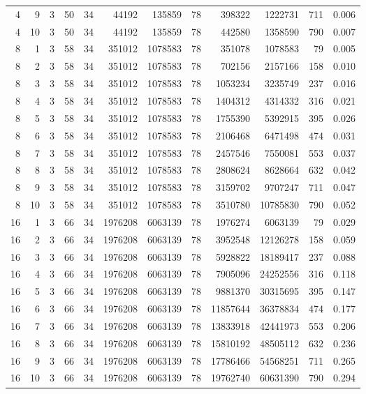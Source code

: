 \begin{table}[t]
\begin{tabularx}{\linewidth}{rrrrrrrrrrrr}
4 & 9 & 3 & 50 & 34 & 44192 & 135859 & 78 & 398322 & 1222731 & 711 & 0.006 \\
4 & 10 & 3 & 50 & 34 & 44192 & 135859 & 78 & 442580 & 1358590 & 790 & 0.007 \\
8 & 1 & 3 & 58 & 34 & 351012 & 1078583 & 78 & 351078 & 1078583 & 79 & 0.005 \\
8 & 2 & 3 & 58 & 34 & 351012 & 1078583 & 78 & 702156 & 2157166 & 158 & 0.010 \\
8 & 3 & 3 & 58 & 34 & 351012 & 1078583 & 78 & 1053234 & 3235749 & 237 & 0.016 \\
8 & 4 & 3 & 58 & 34 & 351012 & 1078583 & 78 & 1404312 & 4314332 & 316 & 0.021 \\
8 & 5 & 3 & 58 & 34 & 351012 & 1078583 & 78 & 1755390 & 5392915 & 395 & 0.026 \\
8 & 6 & 3 & 58 & 34 & 351012 & 1078583 & 78 & 2106468 & 6471498 & 474 & 0.031 \\
8 & 7 & 3 & 58 & 34 & 351012 & 1078583 & 78 & 2457546 & 7550081 & 553 & 0.037 \\
8 & 8 & 3 & 58 & 34 & 351012 & 1078583 & 78 & 2808624 & 8628664 & 632 & 0.042 \\
8 & 9 & 3 & 58 & 34 & 351012 & 1078583 & 78 & 3159702 & 9707247 & 711 & 0.047 \\
8 & 10 & 3 & 58 & 34 & 351012 & 1078583 & 78 & 3510780 & 10785830 & 790 & 0.052 \\
16 & 1 & 3 & 66 & 34 & 1976208 & 6063139 & 78 & 1976274 & 6063139 & 79 & 0.029 \\
16 & 2 & 3 & 66 & 34 & 1976208 & 6063139 & 78 & 3952548 & 12126278 & 158 & 0.059 \\
16 & 3 & 3 & 66 & 34 & 1976208 & 6063139 & 78 & 5928822 & 18189417 & 237 & 0.088 \\
16 & 4 & 3 & 66 & 34 & 1976208 & 6063139 & 78 & 7905096 & 24252556 & 316 & 0.118 \\
16 & 5 & 3 & 66 & 34 & 1976208 & 6063139 & 78 & 9881370 & 30315695 & 395 & 0.147 \\
16 & 6 & 3 & 66 & 34 & 1976208 & 6063139 & 78 & 11857644 & 36378834 & 474 & 0.177 \\
16 & 7 & 3 & 66 & 34 & 1976208 & 6063139 & 78 & 13833918 & 42441973 & 553 & 0.206 \\
16 & 8 & 3 & 66 & 34 & 1976208 & 6063139 & 78 & 15810192 & 48505112 & 632 & 0.236 \\
16 & 9 & 3 & 66 & 34 & 1976208 & 6063139 & 78 & 17786466 & 54568251 & 711 & 0.265 \\
16 & 10 & 3 & 66 & 34 & 1976208 & 6063139 & 78 & 19762740 & 60631390 & 790 & 0.294 \\
\bottomrule
\end{tabularx}
\end{table}

